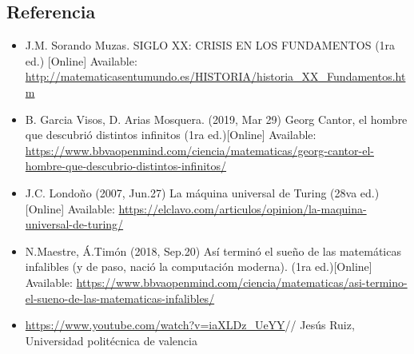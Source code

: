\documentclass[11pt]{article}
\begin{document}
\subsection*{Referencia}
%
\begin{itemize}
    \item J.M. Sorando Muzas. SIGLO XX: CRISIS EN LOS FUNDAMENTOS  (1ra ed.) [Online] Available: \url{http://matematicasentumundo.es/HISTORIA/historia_XX_Fundamentos.htm}
    \item B. Garcia Visos, D. Arias Mosquera. (2019, Mar 29) Georg Cantor, el hombre que descubrió distintos infinitos (1ra ed.)[Online] Available: \url{https://www.bbvaopenmind.com/ciencia/matematicas/georg-cantor-el-hombre-que-descubrio-distintos-infinitos/}
    \item J.C. Londoño (2007, Jun.27) La máquina universal de Turing (28va ed.)[Online] Available: \url{https://elclavo.com/articulos/opinion/la-maquina-universal-de-turing/}
    \item N.Maestre, Á.Timón (2018, Sep.20) Así terminó el sueño de las matemáticas infalibles (y de paso, nació la computación moderna). (1ra ed.)[Online] Available: \url{https://www.bbvaopenmind.com/ciencia/matematicas/asi-termino-el-sueno-de-las-matematicas-infalibles/}
    \item \url{https://www.youtube.com/watch?v=iaXLDz_UeYY}// Jesús Ruiz, Universidad politécnica de valencia 

\end{itemize}
\end{document}
